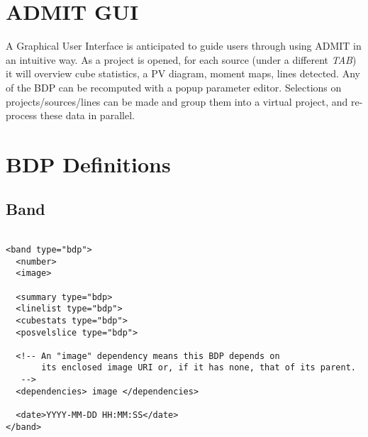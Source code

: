 \documentclass{article}
\begin{document}
%
%
%
%
%  
%
%
%
%

\section{ADMIT GUI}

A Graphical User Interface is anticipated to guide users through 
using ADMIT in an intuitive way. As a project is opened, for each source
(under a different {\it TAB}) it will overview cube statistics, a PV diagram,
moment maps, lines detected.  Any of the BDP can be recomputed with a popup
parameter editor. Selections on projects/sources/lines can be made and group
them into a virtual project, and re-process these data in parallel.

\appendix
\section{BDP Definitions}

\subsection{Band}
\footnotesize
\begin{verbatim}

<band type="bdp">
  <number>
  <image>

  <summary type="bdp>
  <linelist type="bdp">
  <cubestats type="bdp">
  <posvelslice type="bdp">

  <!-- An "image" dependency means this BDP depends on 
       its enclosed image URI or, if it has none, that of its parent.
   -->
  <dependencies> image </dependencies>

  <date>YYYY-MM-DD HH:MM:SS</date>
</band>

\end{verbatim}
\end{document}
